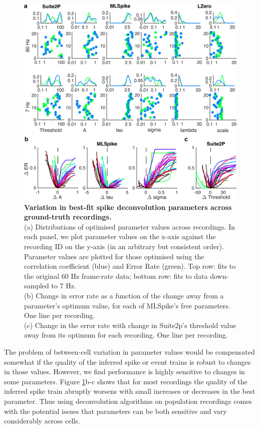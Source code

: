 \documentclass[a4paper,11pt]{article}
\begin{document}
\begin{figure}[h!]
\includegraphics[width=\textwidth]{composite_figs/fig2_param_sweep.png}
\caption{\textbf{Variation in best-fit spike deconvolution parameters across ground-truth recordings.} 	\label{fig:GT_data_params} \\
	(a) Distributions of optimised parameter values across recordings. In each panel, we plot parameter values on the x-axis against the recording ID on the y-axis (in an arbitrary but consistent order). Parameter values are plotted for those optimised using the correlation coefficient (blue) and Error Rate (green). Top row: fits to the original 60 Hz frame-rate data; bottom row: fits to data down-sampled to 7 Hz. \\
	(b) Change in error rate as a function of the change away from a parameter's optimum value, for each of MLSpike's free parameters. One line per recording. \\
	(c) Change in the error rate with change in Suite2p's threshold value away from its optimum for each recording. One line per recording.
}
\end{figure}

The problem of between-cell variation in parameter values would be compensated somewhat if the quality of the inferred spike or event trains is robust to changes in those values. However, we find performance is highly sensitive to changes in some parameters. Figure \ref{fig:GT_data_params}b-c shows that for most recordings the quality of the inferred spike train abruptly worsens with small increases or decreases in the best parameter. Thus using deconvolution algorithms on population recordings comes with the potential issues that parameters can be both sensitive and vary considerably across cells.
\end{document}
